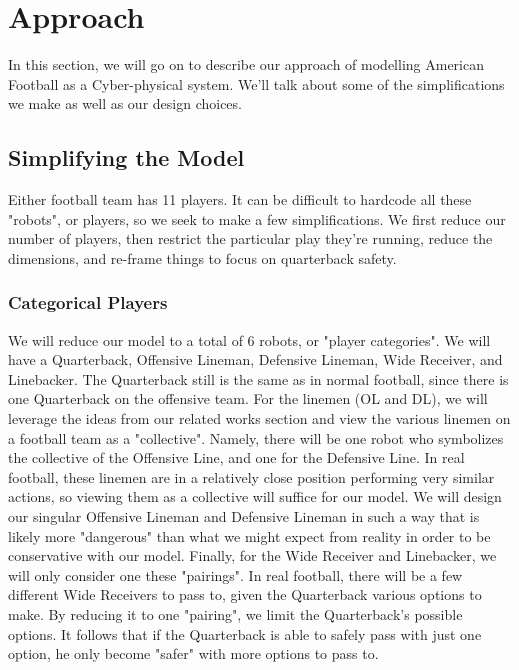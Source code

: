 \newpage


\section{Approach}

\quad In this section, we will go on to describe our approach of modelling American Football as a Cyber-physical system. We'll talk about some of the simplifications we make as well as our design choices.

\subsection{Simplifying the Model}

\quad Either football team has 11 players. It can be difficult to hardcode all these "robots", or players, so we seek to make a few simplifications. We first reduce our number of players, then restrict the particular play they're running, reduce the dimensions, and re-frame things to focus on quarterback safety.

\subsubsection{Categorical Players}

\quad We will reduce our model to a total of 6 robots, or "player categories". We will have a Quarterback, Offensive Lineman, Defensive Lineman, Wide Receiver, and Linebacker. The Quarterback still is the same as in normal football, since there is one Quarterback on the offensive team. For the linemen (OL and DL), we will leverage the ideas from our related works section and view the various linemen on a football team as a "collective". Namely, there will be one robot who symbolizes the collective of the Offensive Line, and one for the Defensive Line. In real football, these linemen are in a relatively close position performing very similar actions, so viewing them as a collective will suffice for our model. We will design our singular Offensive Lineman and Defensive Lineman in such a way that is likely more "dangerous" than what we might expect from reality in order to be conservative with our model. Finally, for the Wide Receiver and Linebacker, we will only consider one these "pairings". In real football, there will be a few different Wide Receivers to pass to, given the Quarterback various options to make. By reducing it to one "pairing", we limit the Quarterback's possible options. It follows that if the Quarterback is able to safely pass with just one option, he only become "safer" with more options to pass to.

